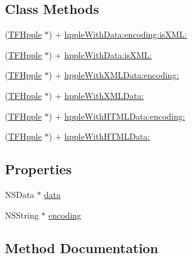 \subsection*{Class Methods}
\begin{DoxyCompactItemize}
\item 
(\hyperlink{interface_t_f_hpple}{T\+F\+Hpple} $\ast$) + \hyperlink{interface_t_f_hpple_ae90410d514268088d6c782bb75314523}{hpple\+With\+Data\+:encoding\+:is\+X\+M\+L\+:}
\item 
(\hyperlink{interface_t_f_hpple}{T\+F\+Hpple} $\ast$) + \hyperlink{interface_t_f_hpple_a3a71c0b14f603c7a0c9a51e94b1901db}{hpple\+With\+Data\+:is\+X\+M\+L\+:}
\item 
(\hyperlink{interface_t_f_hpple}{T\+F\+Hpple} $\ast$) + \hyperlink{interface_t_f_hpple_a60815c4d5bbf7d15d1970a63d6c069e9}{hpple\+With\+X\+M\+L\+Data\+:encoding\+:}
\item 
(\hyperlink{interface_t_f_hpple}{T\+F\+Hpple} $\ast$) + \hyperlink{interface_t_f_hpple_a9f6634ba04c1756a00919171cc26ea6b}{hpple\+With\+X\+M\+L\+Data\+:}
\item 
(\hyperlink{interface_t_f_hpple}{T\+F\+Hpple} $\ast$) + \hyperlink{interface_t_f_hpple_ae83067b1e5c80647d2bd1d19d5d391ff}{hpple\+With\+H\+T\+M\+L\+Data\+:encoding\+:}
\item 
(\hyperlink{interface_t_f_hpple}{T\+F\+Hpple} $\ast$) + \hyperlink{interface_t_f_hpple_a05ff6db676283713ae714fcfb9a485a9}{hpple\+With\+H\+T\+M\+L\+Data\+:}
\end{DoxyCompactItemize}
\subsection*{Properties}
\begin{DoxyCompactItemize}
\item 
N\+S\+Data $\ast$ \hyperlink{interface_t_f_hpple_af8002e454472111f4af37d7b48ccbade}{data}
\item 
N\+S\+String $\ast$ \hyperlink{interface_t_f_hpple_a790232945cc92e254fb9788089273d1f}{encoding}
\end{DoxyCompactItemize}


\subsection{Method Documentation}
\hypertarget{interface_t_f_hpple_ae90410d514268088d6c782bb75314523}{}
